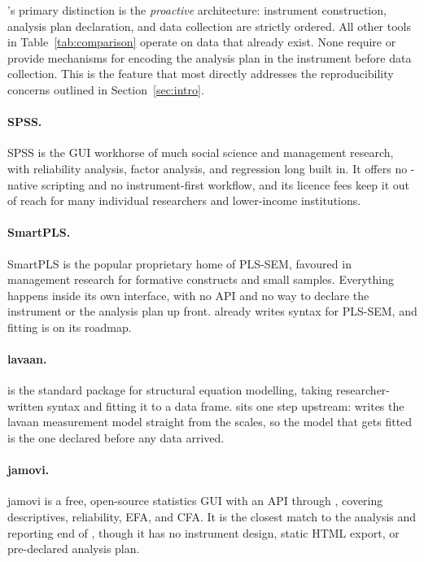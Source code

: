 \documentclass[article]{jss}\usepackage[]{graphicx}\usepackage[]{xcolor}
\begin{document}
's primary distinction is the \emph{proactive}
architecture: instrument construction, analysis plan declaration, and
data collection are strictly ordered. All other tools in
Table~\ref{tab:comparison} operate on data that already exist. None
require or provide mechanisms for encoding the analysis plan in the
instrument before data collection. This is the feature that most
directly addresses the reproducibility concerns outlined in
Section~\ref{sec:intro}.

\paragraph{SPSS.} SPSS \citep{ibm2023} is the GUI workhorse of much
social science and management research, with reliability analysis,
factor analysis, and regression long built in. It offers no
-native scripting and no instrument-first workflow, and its
licence fees keep it out of reach for many individual researchers and
lower-income institutions.

\paragraph{SmartPLS.} SmartPLS \citep{ringleetal2022} is the popular
proprietary home of PLS-SEM, favoured in management research for
formative constructs and small samples. Everything happens inside its
own interface, with no  API and no way to declare the
instrument or the analysis plan up front.  already
writes  syntax for PLS-SEM, and fitting is on its roadmap.

\paragraph{lavaan.}  \citep{rosseel2012} is the standard
 package for structural equation modelling, taking
researcher-written syntax and fitting it to a data frame.
 sits one step upstream:  writes
the lavaan measurement model straight from the  scales, so
the model that gets fitted is the one declared before any data arrived.

\paragraph{jamovi.} jamovi \citep{thejamoviproject2022} is a free,
open-source statistics GUI with an  API through ,
covering descriptives, reliability, EFA, and CFA. It is the closest
match to the analysis and reporting end of , though it
has no instrument design, static HTML export, or pre-declared analysis
plan.
\end{document}

